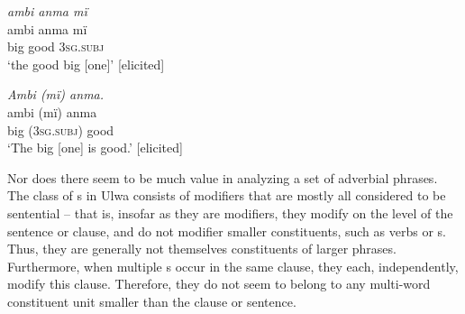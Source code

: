 \ea%
    \label{ex:phrase:108}
          \textit{ambi anma mï}\\
\gll    ambi  anma  mï\\
    big    good  \textsc{3sg.subj}\\
\glt `the good big [one]’ [elicited]
\z

\ea%
    \label{ex:phrase:109}
          \textit{Ambi (mï) anma.}\\
\gll    ambi  (mï)    anma\\
    big    (3\textsc{sg.subj)}  good\\
\glt `The big [one] is good.’ [elicited]
\z

Nor does there seem to be much value in analyzing a set of adverbial phrases. The class of s in Ulwa consists of modifiers that are mostly all considered to be  sentential -- that is, insofar as they are modifiers, they modify on the level of the sentence or clause, and do not modifier smaller constituents, such as verbs or s. Thus, they are generally not themselves constituents of larger phrases. Furthermore, when multiple s occur in the same clause, they each, independently, modify this clause. Therefore, they do not seem to belong to any multi-word constituent unit smaller than the clause or sentence.


